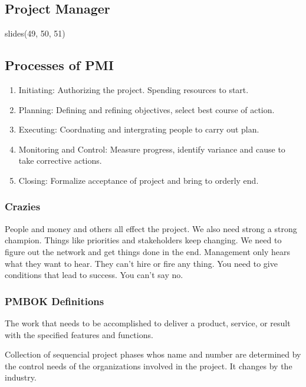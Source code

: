\documentclass[english, 11pt]{article}
\begin{document}
    \subsection{Project Manager}
      slides(49, 50, 51)

    \subsection{Processes of PMI}
      \begin{enumerate}
        \item Initiating: Authorizing the project. Spending resources to start.
        \item Planning: Defining and refining objectives, select best course of action.
        \item Executing: Coordnating and intergrating people to carry out plan.
        \item Monitoring and Control: Measure progress, identify variance and cause to take corrective actions.
        \item Closing: Formalize acceptance of project and bring to orderly end.
      \end{enumerate}

    \subsubsection*{Crazies}
      People and money and others all effect the project. We also need strong a strong champion. Things like priorities and stakeholders keep changing. We need to figure out the network and get things done in the end. Management only hears what they want to hear. They can't hire or fire any thing. You need to give conditions that lead to success. You can't say no.

    \subsubsection{PMBOK Definitions}\label{pmbok}

      \begin{defn}\label{scope}
        The work that needs to be accomplished to deliver a product, service, or result with the specified features and functions.
      \end{defn}

      \begin{defn}\label{plc}
        Collection of sequencial project phases whos name and number are determined by the control needs of the organizations involved in the project. It changes by the industry.
      \end{defn}
\end{document}
